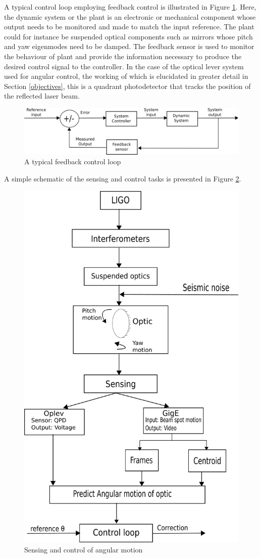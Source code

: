 \documentclass[colorlinks=true,pdfstartview=FitV,linkcolor=blue,
            citecolor=red,urlcolor=magenta]{ligodoc}
\begin{document}
A typical control loop employing feedback control is illustrated in Figure \ref{fig:control_loop_bd}. Here, the dynamic system or the plant is an electronic or mechanical component whose output needs to be monitored and made to match the input reference. The plant could for instance be suspended optical components such as mirrors whose pitch and yaw eigenmodes need to be damped. The feedback sensor is used to monitor the behaviour of plant and provide the information necessary to produce the desired control signal to the controller. In the case of the optical lever system used for angular control, the working of which is elucidated in greater detail in Section \ref{objectives}, this is a quadrant photodetector that tracks the position of the reflected laser beam. 


\begin{figure}[htbp]
\begin{center}
\includegraphics[width=.7\linewidth]{control_loop_bd.pdf}
\caption{A typical feedback control loop}
\label{fig:control_loop_bd}
\end{center}
\end{figure} 

A simple schematic of the sensing and control tasks is presented in Figure \ref{fig:overall}. 

\begin{figure}[htbp]
\begin{center}
\includegraphics[width=.7\linewidth]{overall.pdf}
\caption{Sensing and control of angular motion}
\label{fig:overall}
\end{center}
\end{figure} 
\end{document}

